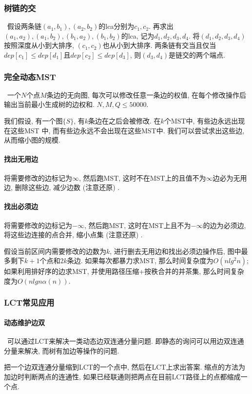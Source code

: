 \subsubsection{树链的交}\
	假设两条链$(a_1, b_1), (a_2, b_2)$的lca分别为$c_1, c_2$.
	再求出$(a_1, a_2), (a_1, b_2), (b_1, a_2), (b_1, b_2)$的lca,
	记为$d_1, d_2, d_3, d_4$.
	将$(d_1, d_2, d_3, d_4)$按照深度从小到大排序,
	$(c_1,c_2)$也从小到大排序.
	两条链有交当且仅当$dep[c_1] \leq dep[d_1]$且$dep[c_2] \leq dep[d_3]$,
	则$(d_3, d_4)$是链交的两个端点.

\subsubsection{完全动态MST}\
    一个$N$个点$M$条边的无向图, 每次可以修改任意一条边的权值, 在每个修改操作后输出当前最小生成树的边权和. $N,M,Q\leq50000$. 
    \par 我们假设, 有一个图$\{S\}$, 有$k$条边在之后会被修改. 在$k$个MST中, 有些边永远出现在这些MST 中, 而有些边永远不会出现在这些MST中. 我们可以尝试求出这些边, 从而缩小图的规模. 
    \paragraph{找出无用边}将需要修改的边标记为$\infty$, 然后跑MST, 这时不在MST上的且值不为$\infty$边必为无用边, 删除这些边, 减少边数 (注意还原) . 
    \paragraph{找出必须边}将需要修改的边标记为$-\infty$, 然后跑MST, 这时在MST上且不为$-\infty$的边为必须边, 将这些边连接的点合并, 缩小点集 (注意还原) . 
    \par 假设当前区间内需要修改的边数为$k$, 进行删去无用边和找出必须边操作后, 图中最多剩下$k+1$个点和$2k$条边. 如果每次都暴力求MST, 那么时间复杂度为$O(nlg^2n)$; 如果利用排好序的边求MST, 并使用路径压缩+按秩合并的并茶集, 那么时间复杂度为$O(nlgn\alpha (n))$. 

\subsubsection{LCT常见应用}
	\paragraph{动态维护边双}\
		可以通过LCT来解决一类动态边双连通分量问题. 即静态的询问可以用边双连通分量来解决, 而树有加边等操作的问题. 
		\par 把一个边双连通分量缩到LCT的一个点中, 然后在LCT上求出答案. 缩点的方法为加边时判断两点的连通性, 如果已经联通则把两点在目前LCT路径上的点都缩成一个点. 


